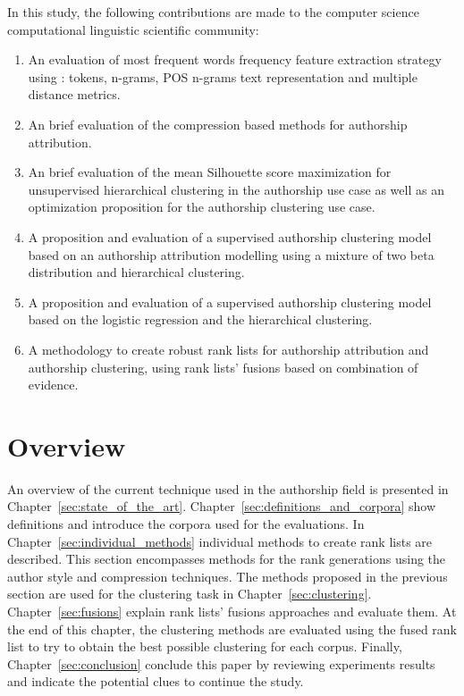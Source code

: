 In this study, the following contributions are made to the computer science computational linguistic scientific community:

\begin{enumerate}
  \item
  An evaluation of most frequent words frequency feature extraction strategy using : tokens, n-grams, POS n-grams text representation and multiple distance metrics.
  \item
  An brief evaluation of the compression based methods for authorship attribution.
  \item
  An brief evaluation of the mean Silhouette score maximization for unsupervised hierarchical clustering in the authorship use case as well as an optimization proposition for the authorship clustering use case.
  \item
  A proposition and evaluation of a supervised authorship clustering model based on an authorship attribution modelling using a mixture of two beta distribution and hierarchical clustering.
  \item
  A proposition and evaluation of a supervised authorship clustering model based on the logistic regression and the hierarchical clustering.
  \item
  A methodology to create robust rank lists for authorship attribution and authorship clustering, using rank lists' fusions based on combination of evidence.
\end{enumerate}

\section{Overview}

An overview of the current technique used in the authorship field is presented in Chapter~\ref{sec:state_of_the_art}.
Chapter~\ref{sec:definitions_and_corpora} show definitions and introduce the corpora used for the evaluations.
In Chapter~\ref{sec:individual_methods} individual methods to create rank lists are described.
This section encompasses methods for the rank generations using the author style and compression techniques.
The methods proposed in the previous section are used for the clustering task in Chapter~\ref{sec:clustering}.
Chapter~\ref{sec:fusions} explain rank lists' fusions approaches and evaluate them.
At the end of this chapter, the clustering methods are evaluated using the fused rank list to try to obtain the best possible clustering for each corpus.
Finally, Chapter~\ref{sec:conclusion} conclude this paper by reviewing experiments results and indicate the potential clues to continue the study.

